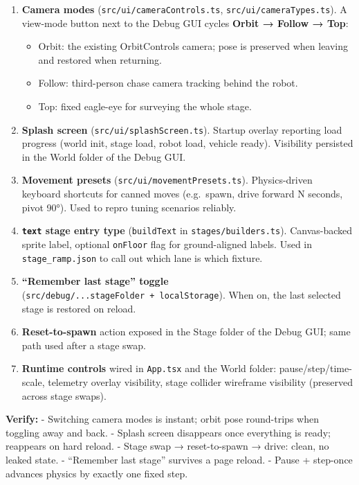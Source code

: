 \documentclass[
]{article}
\providecommand{\tightlist}{%
  \setlength{\itemsep}{0pt}\setlength{\parskip}{0pt}}
\begin{document}
\begin{enumerate}
\def\labelenumi{\arabic{enumi}.}
\tightlist
\item
  \textbf{Camera modes} (\texttt{src/ui/cameraControls.ts},
  \texttt{src/ui/cameraTypes.ts}). A view-mode button next to the Debug
  GUI cycles \textbf{Orbit → Follow → Top}:

  \begin{itemize}
  \tightlist
  \item
    Orbit: the existing OrbitControls camera; pose is preserved when
    leaving and restored when returning.
  \item
    Follow: third-person chase camera tracking behind the robot.
  \item
    Top: fixed eagle-eye for surveying the whole stage.
  \end{itemize}
\item
  \textbf{Splash screen} (\texttt{src/ui/splashScreen.ts}). Startup
  overlay reporting load progress (world init, stage load, robot load,
  vehicle ready). Visibility persisted in the World folder of the Debug
  GUI.
\item
  \textbf{Movement presets} (\texttt{src/ui/movementPresets.ts}).
  Physics-driven keyboard shortcuts for canned moves (e.g.~spawn, drive
  forward N seconds, pivot 90°). Used to repro tuning scenarios
  reliably.
\item
  \textbf{\texttt{text} stage entry type} (\texttt{buildText} in
  \texttt{stages/builders.ts}). Canvas-backed sprite label, optional
  \texttt{onFloor} flag for ground-aligned labels. Used in
  \texttt{stage\_ramp.json} to call out which lane is which fixture.
\item
  \textbf{``Remember last stage'' toggle}
  (\texttt{src/debug/...stageFolder\ +\ localStorage}). When on, the
  last selected stage is restored on reload.
\item
  \textbf{Reset-to-spawn} action exposed in the Stage folder of the
  Debug GUI; same path used after a stage swap.
\item
  \textbf{Runtime controls} wired in \texttt{App.tsx} and the World
  folder: pause/step/time-scale, telemetry overlay visibility, stage
  collider wireframe visibility (preserved across stage swaps).
\end{enumerate}

\textbf{Verify:} - Switching camera modes is instant; orbit pose
round-trips when toggling away and back. - Splash screen disappears once
everything is ready; reappears on hard reload. - Stage swap →
reset-to-spawn → drive: clean, no leaked state. - ``Remember last
stage'' survives a page reload. - Pause + step-once advances physics by
exactly one fixed step.
\end{document}
